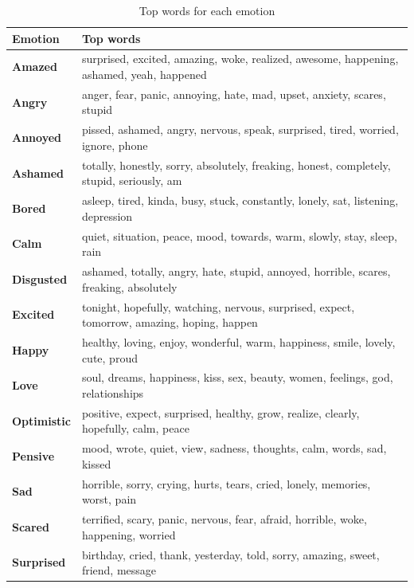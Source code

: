 \documentclass{article} %
\begin{document}
\begin{table}[H]
\caption{Top words for each emotion}
\begin{center}
    \begin{tabular}{ l | l}
    Emotion & Top words\\
    \hline
    \textbf{Amazed} & surprised, excited, amazing, woke, realized, awesome, happening, ashamed, yeah, happened\\
    \textbf{Angry} & anger, fear, panic, annoying, hate, mad, upset, anxiety, scares, stupid\\
    \textbf{Annoyed} & pissed, ashamed, angry, nervous, speak, surprised, tired, worried, ignore, phone\\
    \textbf{Ashamed} & totally, honestly, sorry, absolutely, freaking, honest, completely, stupid, seriously, am\\
    \textbf{Bored} & asleep, tired, kinda, busy, stuck, constantly, lonely, sat, listening, depression\\
    \textbf{Calm} & quiet, situation, peace, mood, towards, warm, slowly, stay, sleep, rain\\
    \textbf{Disgusted} & ashamed, totally, angry, hate, stupid, annoyed, horrible, scares, freaking, absolutely\\
    \textbf{Excited} & tonight, hopefully, watching, nervous, surprised, expect, tomorrow, amazing, hoping, happen\\
    \textbf{Happy} & healthy, loving, enjoy, wonderful, warm, happiness, smile, lovely, cute, proud\\
    \textbf{Love} & soul, dreams, happiness, kiss, sex, beauty, women, feelings, god, relationships \\
    \textbf{Optimistic} & positive, expect, surprised, healthy, grow, realize, clearly, hopefully, calm, peace\\
    \textbf{Pensive} & mood, wrote, quiet, view, sadness, thoughts, calm, words, sad, kissed\\
    \textbf{Sad} & horrible, sorry, crying, hurts, tears, cried, lonely, memories, worst, pain\\
    \textbf{Scared} & terrified, scary, panic, nervous, fear, afraid, horrible, woke, happening, worried\\
    \textbf{Surprised} & birthday, cried, thank, yesterday, told, sorry, amazing, sweet, friend,  message\\
    \end{tabular}
\end{center} 
\label{top-words}
\end{table}
\end{document}
